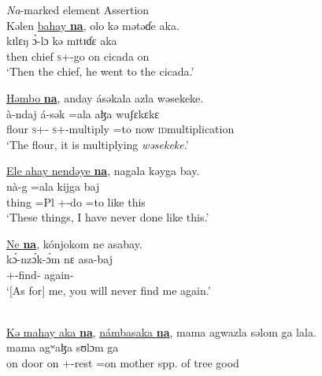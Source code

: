 
\textit{Na}-marked element  \hspace{40pt}    Assertion
\ea \label{ex:11:27}
\\
Kəlen  \underline{bahay  \textbf{na}}, \hspace{30pt}  olo  kə  mətəɗe  aka.\\
\gll  kɪlɛŋ     \hspace{35pt}   \`{ɔ}-lɔ          kə  mɪtɪɗɛ  aka\\
      then    chief {\PSP} {}   \textsc{s}+{\PFV}-go        on  cicada  on\\
\glt  ‘Then the chief, he went to the cicada.’  
\z

\ea \label{ex:11:28}
\underline{Həmbo  \textbf{na}},  anday  ásəkala  azla  wəsekeke.\\
\gll  {}      à-ndaj     á-sək    =ala      aɮa   wuʃɛkɛkɛ\\
      flour  {\PSP}  \textsc{s}+{\PFV}-{\PRG}   \textsc{s}+{\IFV}-multiply  =to  now    \textsc{id}multiplication\\
\glt  ‘The flour, it is multiplying \textit{wəsekeke}.’
\z

\ea \label{ex:11:29}
\underline{Ele  ahay  nendəye  \textbf{na}},  nagala  kəyga  bay.\\
\gll  {}       nà-g    =ala  kijga  baj\\
      thing  =Pl        {\DEM}     {\PSP}  {\oneS}+{\PFV}-do  =to     {like this}  {\NEG}\\
\glt ‘These things, I have never done like this.’
\z

\ea \label{ex:11:30}
\underline{Ne  \textbf{na}},  kónjokom  ne  asabay. \\
\gll  {}     k\'ɔ-nz\'ɔk-\'ɔm  nɛ  asa-baj \\
      {\oneS}    {\PSP}    {\twoP}+{\IFV}-find-{\twoP}  {\oneS}  again-{\NEG}\\
\glt  ‘[As for] me, you will never find me again.’
\z

\ea \label{ex:11:31}
\\
\underline{Kə  mahay  aka  \textbf{na}}, \underline{námbasaka  \textbf{na}},  mama  agwazla  səlom  ga  lala.\\
\gll  {}             mama   agʷaɮa    sʊlɔm  ga \\    
      on  door  on  {\PSP}  {\oneS}+{\IFV}-rest  =on    {\PSP}  mother  {spp. of tree}  good   {\ADJ} \\  
      

